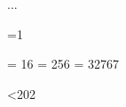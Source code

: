 \endETEX


\ifx\eTeX\undefined

  \def\eTeX{$\varepsilon$-\TeX}

\fi


\beginETEX \new...


\def\newcount   {\myalloc@0\count   \countdef   \@@maxallocation}
\def\newdimen   {\myalloc@1\dimen   \dimendef   \@@maxallocation}
\def\newskip    {\myalloc@2\skip    \skipdef    \@@maxallocation}
\def\newmuskip  {\myalloc@3\muskip  \muskipdef  \@@maxallocation}
\def\newbox     {\myalloc@4\box     \mathchardef\@@maxallocation}
\def\newtoks    {\myalloc@5\toks    \toksdef    \@@maxallocation}
\def\newread    {\myalloc@6\read    \chardef    \@@minallocation}
\def\newwrite   {\myalloc@7\write   \chardef    \@@minallocation}
\def\newmarks   {\myalloc@8\marks   \mathchardef\@@maxallocation}
\def\newlanguage{\myalloc@9\language\chardef    \@@minallocation}


\def\newfam#1{\chardef#1=15 }


=1


\mathchardef\@@minallocation =    16
\mathchardef\@@medallocation =   256
\mathchardef\@@maxallocation = 32767


\chardef{}


\ifnum\etexversion<202 \chardef{} \fi



